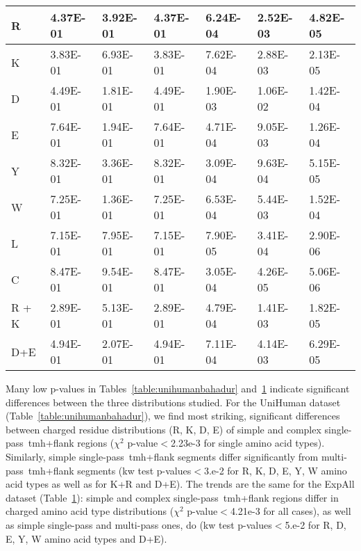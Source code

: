\begin{table}[htbp]
{\begin{tabular}{ p{5em} l l l l l l }
    \midrule
     R    & 4.37E-01 & 3.92E-01 & 4.37E-01 & 6.24E-04 & 2.52E-03 & 4.82E-05 \\
    \midrule
     K    & 3.83E-01 & 6.93E-01 & 3.83E-01 & 7.62E-04 & 2.88E-03 & 2.13E-05 \\
    \midrule
     D    & 4.49E-01 & 1.81E-01 & 4.49E-01 & 1.90E-03 & 1.06E-02 & 1.42E-04 \\
    \midrule
     E    & 7.64E-01 & 1.94E-01 & 7.64E-01 & 4.71E-04 & 9.05E-03 & 1.26E-04 \\
    \midrule
     Y    & 8.32E-01 & 3.36E-01 & 8.32E-01 & 3.09E-04 & 9.63E-04 & 5.15E-05 \\
    \midrule
     W    & 7.25E-01 & 1.36E-01 & 7.25E-01 & 6.53E-04 & 5.44E-03 & 1.52E-04 \\
    \midrule
     L    & 7.15E-01 & 7.95E-01 & 7.15E-01 & 7.90E-05 & 3.41E-04 & 2.90E-06 \\
    \midrule
     C    & 8.47E-01 & 9.54E-01 & 8.47E-01 & 3.05E-04 & 4.26E-05 & 5.06E-06 \\
    \midrule
     R + K & 2.89E-01 & 5.13E-01 & 2.89E-01 & 4.79E-04 & 1.41E-03 & 1.82E-05 \\
    \midrule
     D+E & 4.94E-01 & 2.07E-01 & 4.94E-01 & 7.11E-04 & 4.14E-03 & 6.29E-05 \\
    \bottomrule
    \end{tabular}%
    }%
   \label{table:expallbahadur}

\end{table}%

Many low p\--values in Tables~\ref{table:unihumanbahadur} and~\ref{table:expallbahadur} indicate significant differences between the three distributions studied.
For the UniHuman dataset (Table~\ref{table:unihumanbahadur}), we find most striking, significant differences between charged residue distributions (R, K, D, E) of simple and complex single\--pass~\gls{tmh}+flank regions (\({\chi}^{2}\) p\--value$<$2.23e-3 for single amino acid types).
Similarly, simple single\--pass~\gls{tmh}+flank segments differ significantly from multi\--pass~\gls{tmh}+flank segments (\gls{kw} test p\--values$<$3.e-2 for R, K, D, E, Y, W amino acid types as well as for K+R and D+E).
The trends are the same for the ExpAll dataset (Table~\ref{table:expallbahadur}): simple and complex single\--pass~\gls{tmh}+flank regions differ in charged amino acid type distributions (\({\chi}^{2}\) p\--value$<$4.21e-3 for all cases), as well as simple single\--pass and multi\--pass ones, do (\gls{kw} test p\--values$<$5.e-2 for R, D, E, Y, W amino acid types and D+E).

